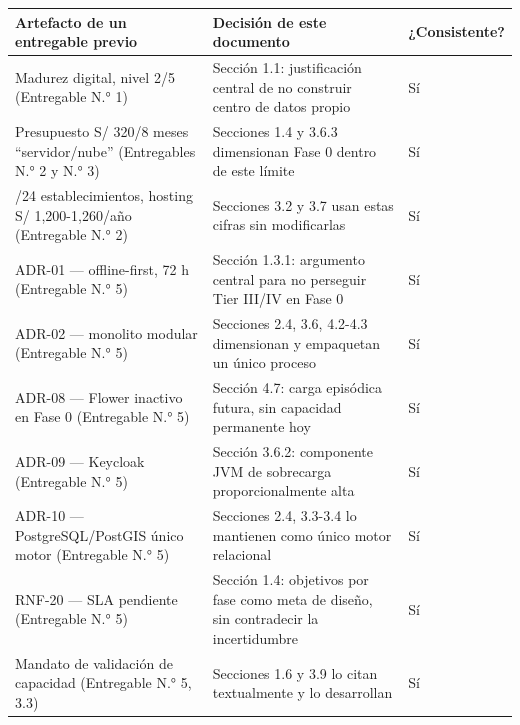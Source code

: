 \documentclass[11pt,a4paper]{article}
\begin{document}
{\small
\begin{longtable}[]{@{}
  >{\raggedright\arraybackslash}p{}
  >{\raggedright\arraybackslash}p{}
  >{\raggedright\arraybackslash}p{}@{}}
\toprule\noalign{}
\begin{minipage}[b]{\linewidth}\raggedright
Artefacto de un entregable previo
\end{minipage} & \begin{minipage}[b]{\linewidth}\raggedright
Decisión de este documento
\end{minipage} & \begin{minipage}[b]{\linewidth}\raggedright
¿Consistente?
\end{minipage} \\
\midrule\noalign{}
\endhead
\bottomrule\noalign{}
\endlastfoot
Madurez digital, nivel 2/5 (Entregable N.° 1) & Sección 1.1: justificación central de no construir centro de datos propio & Sí \\
Presupuesto S/ 320/8 meses ``servidor/nube'' (Entregables N.° 2 y N.° 3) & Secciones 1.4 y 3.6.3 dimensionan Fase 0 dentro de este límite & Sí \\
8/24 establecimientos, hosting S/ 1,200-1,260/año (Entregable N.° 2) & Secciones 3.2 y 3.7 usan estas cifras sin modificarlas & Sí \\
ADR-01 --- offline-first, 72 h (Entregable N.° 5) & Sección 1.3.1: argumento central para no perseguir Tier III/IV en Fase 0 & Sí \\
ADR-02 --- monolito modular (Entregable N.° 5) & Secciones 2.4, 3.6, 4.2-4.3 dimensionan y empaquetan un único proceso & Sí \\
ADR-08 --- Flower inactivo en Fase 0 (Entregable N.° 5) & Sección 4.7: carga episódica futura, sin capacidad permanente hoy & Sí \\
ADR-09 --- Keycloak (Entregable N.° 5) & Sección 3.6.2: componente JVM de sobrecarga proporcionalmente alta & Sí \\
ADR-10 --- PostgreSQL/PostGIS único motor (Entregable N.° 5) & Secciones 2.4, 3.3-3.4 lo mantienen como único motor relacional & Sí \\
RNF-20 --- SLA pendiente (Entregable N.° 5) & Sección 1.4: objetivos por fase como meta de diseño, sin contradecir la incertidumbre & Sí \\
Mandato de validación de capacidad (Entregable N.° 5, 3.3) & Secciones 1.6 y 3.9 lo citan textualmente y lo desarrollan & Sí \\

\end{longtable}}
\end{document}
